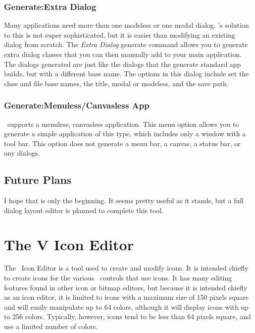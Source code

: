 \subsubsection*{Generate:Extra Dialog}

Many applications need more than one modeless or one modal dialog.
's solution to this is not super sophisticated, but
it is easier than modifying an existing dialog from scratch.
The \emph{Extra Dialog} generate command allows you to generate
extra dialog classes that you can then manually add to your
main application. The dialogs generated are just like the
dialogs that the generate standard app builds, but with
a different base name. The options in this dialog include
set the class and file base names, the title, modal or
modeless, and the save path.

\subsubsection*{Generate:Menuless/Canvasless App}

\V\ supports a menuless, canvasless application. This
menu option allows you to generate a simple application
of this type, which includes only a window with a
tool bar. This option does not generate a menu bar,
a canvas, a status bar, or any dialogs.

\subsection{Future Plans}

I hope that  is only the beginning. It seems
pretty useful as it stands, but a full dialog layout
editor is planned to complete this tool.


\section{The V Icon Editor}

The \V\ Icon Editor is a tool used to create and modify
icons. It is intended chiefly to create icons for the various
\V\ controls that use icons. It has many editing features
found in other icon or bitmap editors, but because it is intended chiefly as
an icon editor, it is limited to icons with a maximum size
of 150 pixels square and will easily manipulate up to 64 colors,
although it will display icons with up to 256 colors.
Typically, however, icons tend to be less than 64 pixels square,
and use a limited number of colors.

